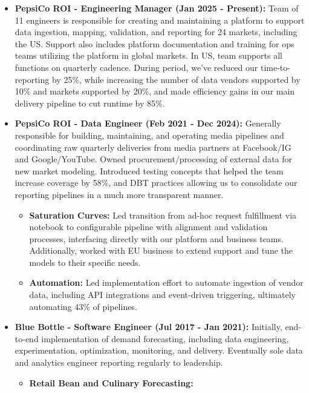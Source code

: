 \documentclass[a4paper,10pt,notitlepage]{article}
\begin{document}
    \begin{itemize}
        \item \textbf{PepsiCo ROI - Engineering Manager (Jan 2025 - Present):} Team of 11 engineers is responsible for creating and maintaining a platform to support data ingestion, mapping, validation, and reporting for 24 markets, including the US. Support also includes platform documentation and training for ops teams utilizing the platform in global markets. In US, team supports all functions on quarterly cadence. During period, we've reduced our time-to-reporting by 25\%, while increasing the number of data vendors supported by 10\% and markets supported by 20\%, and made efficiency gains in our main delivery pipeline to cut runtime by 85\%.
        \item \textbf{PepsiCo ROI - Data Engineer (Feb 2021 - Dec 2024):} Generally responsible for building, maintaining, and operating media pipelines and coordinating raw quarterly deliveries from media partners at Facebook/IG and Google/YouTube. Owned procurement/processing of external data for new market modeling. Introduced testing concepts that helped the team increase coverage by 58\%, and DBT practices allowing us to consolidate our reporting pipelines in a much more transparent manner.
            \begin{itemize}
                    \item \textbf{Saturation Curves:} Led transition from ad-hoc request fulfillment via notebook to configurable pipeline with alignment and validation processes, interfacing directly with our platform and business teams. Additionally, worked with EU business to extend support and tune the models to their specific needs.
                    \item \textbf{Automation:} Led implementation effort to automate ingestion of vendor data, including API integrations and event-driven triggering, ultimately automating 43\% of pipelines.
            \end{itemize}
        \vspace{-5pt}\item \textbf{Blue Bottle - Software Engineer (Jul 2017 - Jan 2021):} Initially, end-to-end implementation of demand forecasting, including data engineering, experimentation, optimization, monitoring, and delivery. Eventually sole data and analytics engineer reporting regularly to leadership.
            \begin{itemize}
                    \item \textbf{Retail Bean and Culinary Forecasting:}


\end{itemize}
\end{itemize}
\end{document}

